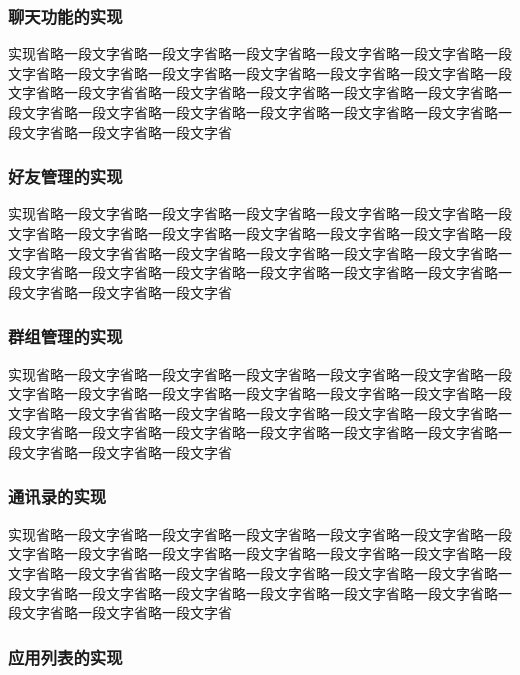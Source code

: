 		\subsubsection{聊天功能的实现}
		
		实现省略一段文字省略一段文字省略一段文字省略一段文字省略一段文字省略一段文字省略一段文字省略一段文字省略一段文字省略一段文字省略一段文字省略一段文字省略一段文字省省略一段文字省略一段文字省略一段文字省略一段文字省略一段文字省略一段文字省略一段文字省略一段文字省略一段文字省略一段文字省略一段文字省略一段文字省略一段文字省
				
	 	\subsubsection{好友管理的实现}
	 	
	 	实现省略一段文字省略一段文字省略一段文字省略一段文字省略一段文字省略一段文字省略一段文字省略一段文字省略一段文字省略一段文字省略一段文字省略一段文字省略一段文字省省略一段文字省略一段文字省略一段文字省略一段文字省略一段文字省略一段文字省略一段文字省略一段文字省略一段文字省略一段文字省略一段文字省略一段文字省略一段文字省
	 	
		\subsubsection{群组管理的实现}
		
		实现省略一段文字省略一段文字省略一段文字省略一段文字省略一段文字省略一段文字省略一段文字省略一段文字省略一段文字省略一段文字省略一段文字省略一段文字省略一段文字省省略一段文字省略一段文字省略一段文字省略一段文字省略一段文字省略一段文字省略一段文字省略一段文字省略一段文字省略一段文字省略一段文字省略一段文字省略一段文字省
		
		\subsubsection{通讯录的实现}
		
		实现省略一段文字省略一段文字省略一段文字省略一段文字省略一段文字省略一段文字省略一段文字省略一段文字省略一段文字省略一段文字省略一段文字省略一段文字省略一段文字省省略一段文字省略一段文字省略一段文字省略一段文字省略一段文字省略一段文字省略一段文字省略一段文字省略一段文字省略一段文字省略一段文字省略一段文字省略一段文字省
		
		\subsubsection{应用列表的实现}
		
